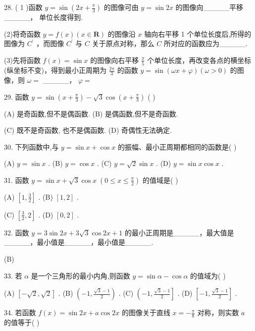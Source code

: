 \documentclass[10pt]{article}
\begin{document}
28. ( 1 )函数 \(y = \sin \left( {{2x} + \frac{\pi }{3}}\right)\) 的图像可由 \(y = \sin {2x}\) 的图像向\_\_\_\_\_平移\_\_\_\_\_， 单位长度得到.

(2)将奇函数 \(y = f\left( x\right) \left( {x \in  \mathbf{R}}\right)\) 的图像沿 \(x\) 轴向右平移 1 个单位长度后,所得的图像为 \({C}^{\prime }\) ，而图像 \({C}^{\prime }\) 与 \(C\) 关于原点对称，那么 \(C\) 所对应的函数应为\_\_\_\_\_.

(3)先将函数 \(f\left( x\right)  = \sin x\) 的图像向右平移 \(\frac{\pi }{5}\) 个单位长度，再改变各点的横坐标 (纵坐标不变)，得到最小正周期为 \(\frac{2\pi }{3}\) 的函数 \(y = \sin \left( {{\omega x} + \varphi }\right) \left( {\omega  > 0}\right)\) 的图像，则 \(\omega  =\) \_\_\_\_\_， \(\varphi  =\)

29. 函数 \(y = \sin \left( {x + \frac{\pi }{3}}\right)  - \sqrt{3}\cos \left( {x + \frac{\pi }{3}}\right)\) ( )

(A) 是奇函数,但不是偶函数. (B) 是偶函数,但不是奇函数.

(C) 既不是奇函数, 也不是偶函数. (D) 奇偶性无法确定.

30. 下列函数中,与 \(y = \sin x + \cos x\) 的振幅、最小正周期都相同的函数是( )

(A) \(y = \sin x\) . (B) \(y = \cos x\) . (C) \(y = \sqrt{2}\sin x\) . (D) \(y = \sin x\cos x\) .

31. 函数 \(y = \sin x + \sqrt{3}\cos x\;\left( {0 \leq  x \leq  \frac{\pi }{2}}\right)\) 的值域是( )

(A) \(\left\lbrack  {1,\frac{3}{2}}\right\rbrack\) . (B) \(\left\lbrack  {1,2}\right\rbrack\) .

(C) \(\left\lbrack  {\frac{3}{2},2}\right\rbrack\) . (D) \(\left\lbrack  {0,2}\right\rbrack\) .

32. 函数 \(y = 3\sin {2x} + 3\sqrt{3}\cos {2x} + 1\) 的最小正周期是\_\_\_\_\_，最大值是\_\_\_\_\_，最小值是\_\_\_\_\_，最小值是\_\_\_\_\_.

(B)

33. 若 \(\alpha\) 是一个三角形的最小内角,则函数 \(y = \sin \alpha  - \cos \alpha\) 的值域为( )

(A) \(\left\lbrack  {-\sqrt{2},\sqrt{2}}\right\rbrack\) . (B) \(\left( {-1,\frac{\sqrt{3} - 1}{2}}\right)\) . (C) \(\left( {-1,\frac{\sqrt{3} - 1}{2}}\right\rbrack\) . (D) \(\left\lbrack  {-1,\frac{\sqrt{3} - 1}{2}}\right\rbrack\) .

34. 若函数 \(f\left( x\right)  = \sin {2x} + a\cos {2x}\) 的图像关于直线 \(x =  - \frac{\pi }{8}\) 对称，则实数 \(a\) 的值等于( )
\end{document}

